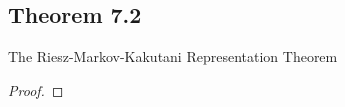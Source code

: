 \documentclass[../../main.tex]{subfiles}
\begin{document}
\subsection{Theorem 7.2}
\begin{wts}
    The Riesz-Markov-Kakutani Representation Theorem
\end{wts}
\begin{proof}
    
\end{proof}
\end{document}

